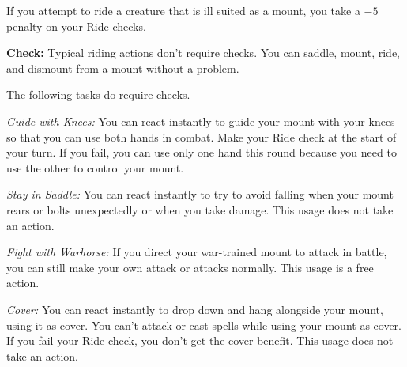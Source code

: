 If you attempt to ride a creature that is ill suited as a mount, you take a $-5$ penalty on your Ride checks.

\textbf{Check:} Typical riding actions don't require checks. You can saddle, mount, ride, and dismount from a mount without a problem.

The following tasks do require checks.


\textit{Guide with Knees:} You can react instantly to guide your mount with your knees so that you can use both hands in combat. Make your Ride check at the start of your turn. If you fail, you can use only one hand this round because you need to use the other to control your mount.

\textit{Stay in Saddle:} You can react instantly to try to avoid falling when your mount rears or bolts unexpectedly or when you take damage. This usage does not take an action.

\textit{Fight with Warhorse:} If you direct your war-trained mount to attack in battle, you can still make your own attack or attacks normally. This usage is a free action.

\textit{Cover:} You can react instantly to drop down and hang alongside your mount, using it as cover. You can't attack or cast spells while using your mount as cover. If you fail your Ride check, you don't get the cover benefit. This usage does not take an action.

